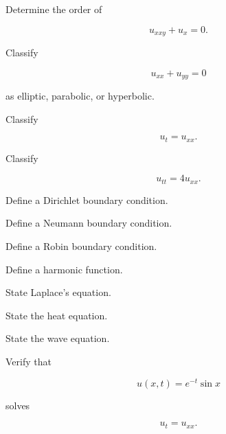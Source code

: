 \begin{exercise}[1]
Determine the order of

\[
u_{xxy}
+
u_x
=
0.
\]
\end{exercise}

\begin{exercise}[1]
Classify

\[
u_{xx}
+
u_{yy}
=
0
\]

as elliptic, parabolic, or hyperbolic.
\end{exercise}

\begin{exercise}[1]
Classify

\[
u_t
=
u_{xx}.
\]
\end{exercise}

\begin{exercise}[1]
Classify

\[
u_{tt}
=
4u_{xx}.
\]
\end{exercise}

\begin{exercise}[1]
Define a Dirichlet boundary condition.
\end{exercise}

\begin{exercise}[1]
Define a Neumann boundary condition.
\end{exercise}

\begin{exercise}[1]
Define a Robin boundary condition.
\end{exercise}

\begin{exercise}[1]
Define a harmonic function.
\end{exercise}

\begin{exercise}[1]
State Laplace's equation.
\end{exercise}

\begin{exercise}[1]
State the heat equation.
\end{exercise}

\begin{exercise}[1]
State the wave equation.
\end{exercise}

\begin{exercise}[2]
Verify that

\[
u(x,t)
=
e^{-t}\sin x
\]

solves

\[
u_t=u_{xx}.
\]
\end{exercise}


